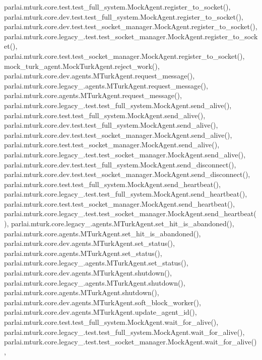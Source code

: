 parlai.\+mturk.\+core.\+test.\+test\+\_\+full\+\_\+system.\+Mock\+Agent.\+register\+\_\+to\+\_\+socket(), parlai.\+mturk.\+core.\+dev.\+test.\+test\+\_\+full\+\_\+system.\+Mock\+Agent.\+register\+\_\+to\+\_\+socket(), parlai.\+mturk.\+core.\+dev.\+test.\+test\+\_\+socket\+\_\+manager.\+Mock\+Agent.\+register\+\_\+to\+\_\+socket(), parlai.\+mturk.\+core.\+legacy\+\_.\+test.\+test\+\_\+socket\+\_\+manager.\+Mock\+Agent.\+register\+\_\+to\+\_\+socket(), parlai.\+mturk.\+core.\+test.\+test\+\_\+socket\+\_\+manager.\+Mock\+Agent.\+register\+\_\+to\+\_\+socket(), mock\+\_\+turk\+\_\+agent.\+Mock\+Turk\+Agent.\+reject\+\_\+work(), parlai.\+mturk.\+core.\+dev.\+agents.\+M\+Turk\+Agent.\+request\+\_\+message(), parlai.\+mturk.\+core.\+legacy\+\_.\+agents.\+M\+Turk\+Agent.\+request\+\_\+message(), parlai.\+mturk.\+core.\+agents.\+M\+Turk\+Agent.\+request\+\_\+message(), parlai.\+mturk.\+core.\+legacy\+\_.\+test.\+test\+\_\+full\+\_\+system.\+Mock\+Agent.\+send\+\_\+alive(), parlai.\+mturk.\+core.\+test.\+test\+\_\+full\+\_\+system.\+Mock\+Agent.\+send\+\_\+alive(), parlai.\+mturk.\+core.\+dev.\+test.\+test\+\_\+full\+\_\+system.\+Mock\+Agent.\+send\+\_\+alive(), parlai.\+mturk.\+core.\+dev.\+test.\+test\+\_\+socket\+\_\+manager.\+Mock\+Agent.\+send\+\_\+alive(), parlai.\+mturk.\+core.\+test.\+test\+\_\+socket\+\_\+manager.\+Mock\+Agent.\+send\+\_\+alive(), parlai.\+mturk.\+core.\+legacy\+\_.\+test.\+test\+\_\+socket\+\_\+manager.\+Mock\+Agent.\+send\+\_\+alive(), parlai.\+mturk.\+core.\+dev.\+test.\+test\+\_\+full\+\_\+system.\+Mock\+Agent.\+send\+\_\+disconnect(), parlai.\+mturk.\+core.\+dev.\+test.\+test\+\_\+socket\+\_\+manager.\+Mock\+Agent.\+send\+\_\+disconnect(), parlai.\+mturk.\+core.\+test.\+test\+\_\+full\+\_\+system.\+Mock\+Agent.\+send\+\_\+heartbeat(), parlai.\+mturk.\+core.\+legacy\+\_.\+test.\+test\+\_\+full\+\_\+system.\+Mock\+Agent.\+send\+\_\+heartbeat(), parlai.\+mturk.\+core.\+test.\+test\+\_\+socket\+\_\+manager.\+Mock\+Agent.\+send\+\_\+heartbeat(), parlai.\+mturk.\+core.\+legacy\+\_.\+test.\+test\+\_\+socket\+\_\+manager.\+Mock\+Agent.\+send\+\_\+heartbeat(), parlai.\+mturk.\+core.\+legacy\+\_.\+agents.\+M\+Turk\+Agent.\+set\+\_\+hit\+\_\+is\+\_\+abandoned(), parlai.\+mturk.\+core.\+agents.\+M\+Turk\+Agent.\+set\+\_\+hit\+\_\+is\+\_\+abandoned(), parlai.\+mturk.\+core.\+dev.\+agents.\+M\+Turk\+Agent.\+set\+\_\+status(), parlai.\+mturk.\+core.\+agents.\+M\+Turk\+Agent.\+set\+\_\+status(), parlai.\+mturk.\+core.\+legacy\+\_.\+agents.\+M\+Turk\+Agent.\+set\+\_\+status(), parlai.\+mturk.\+core.\+dev.\+agents.\+M\+Turk\+Agent.\+shutdown(), parlai.\+mturk.\+core.\+legacy\+\_.\+agents.\+M\+Turk\+Agent.\+shutdown(), parlai.\+mturk.\+core.\+agents.\+M\+Turk\+Agent.\+shutdown(), parlai.\+mturk.\+core.\+dev.\+agents.\+M\+Turk\+Agent.\+soft\+\_\+block\+\_\+worker(), parlai.\+mturk.\+core.\+dev.\+agents.\+M\+Turk\+Agent.\+update\+\_\+agent\+\_\+id(), parlai.\+mturk.\+core.\+test.\+test\+\_\+full\+\_\+system.\+Mock\+Agent.\+wait\+\_\+for\+\_\+alive(), parlai.\+mturk.\+core.\+legacy\+\_.\+test.\+test\+\_\+full\+\_\+system.\+Mock\+Agent.\+wait\+\_\+for\+\_\+alive(), parlai.\+mturk.\+core.\+legacy\+\_.\+test.\+test\+\_\+socket\+\_\+manager.\+Mock\+Agent.\+wait\+\_\+for\+\_\+alive(), 
